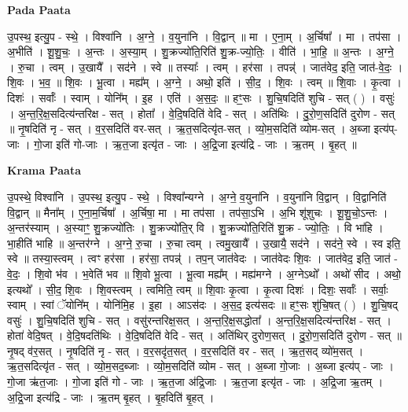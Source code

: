 \documentclass[17pt]{extarticle}
\begin{document}
\textbf{Pada Paata} \newline

उ॒पस्थ॒ इत्यु॒प - स्थे॒ । विश्वा॑नि । अ॒ग्ने॒ । व॒युना॑नि । वि॒द्वान् ॥ मा । ए॒ना॒म् । अ॒र्चिषा᳚ । मा । तप॑सा । अ॒भीति॑ । शू॒शु॒चः॒ । अ॒न्तः । अ॒स्या॒म् । शु॒क्रज्यो॑ति॒रिति॑ शु॒क्र-ज्यो॒तिः॒ । वीति॑ । भा॒हि॒ ॥ अ॒न्तः । अ॒ग्ने॒ । रु॒चा । त्वम् । उ॒खायै᳚ । सद॑ने । स्वे ॥ तस्याः᳚ । त्वम् । हर॑सा । तपन्न्॑ । जात॑वेद॒ इति॒ जात॑-वे॒दः॒ । शि॒वः । भ॒व॒ ॥ शि॒वः । भू॒त्वा । मह्य᳚म् । अ॒ग्ने॒ । अथो॒ इति॑ । सी॒द॒ । शि॒वः । त्वम् ॥ शि॒वाः । कृ॒त्वा । दिशः॑ । सर्वाः᳚ । स्वाम् । योनि᳚म् । इ॒ह । एति॑ । अ॒स॒दः॒ ॥ हꣳ॒॒सः । शु॒चि॒षदिति॑ शुचि - सत् ( ) । वसुः॑ । अ॒न्त॒रि॒क्ष॒सदित्य॑न्तरिक्ष - सत् । होता᳚ । वे॒दि॒षदिति॑ वेदि - सत् । अति॑थिः । दु॒रो॒ण॒सदिति॑ दुरोण - सत् ॥ नृ॒षदिति॑ नृ - सत् । व॒र॒सदिति॑ वर-सत् । ऋ॒त॒सदित्यृ॑त-सत् । व्यो॒म॒सदिति॑ व्योम-सत् । अ॒ब्जा इत्य॑प्-जाः । गो॒जा इति॑ गो-जाः । ऋ॒त॒जा इत्यृ॑त - जाः । अ॒द्रि॒जा इत्य॑द्रि - जाः । ऋ॒तम् । बृ॒हत् ॥  \newline


\textbf{Krama Paata} \newline

उ॒पस्थे॒ विश्वा॑नि । उ॒पस्थ॒ इत्यु॒प - स्थे॒ । विश्वा᳚न्यग्ने । अ॒ग्ने॒ व॒युना॑नि । व॒युना॑नि वि॒द्वान् । वि॒द्वानिति॑ वि॒द्वान् ॥ मैना᳚म् । ए॒ना॒म॒र्चिषा᳚ । अ॒र्चिषा॒ मा । मा तप॑सा । तप॑सा॒ऽभि । अ॒भि शू॑शुचः । शू॒शु॒चो॒ऽन्तः । अ॒न्तर॑स्याम् । अ॒स्याꣳ॒॒ शु॒क्रज्यो॑तिः । शु॒क्रज्यो॑ति॒र् वि । शु॒क्रज्यो॑ति॒रिति॑ शु॒क्र - ज्यो॒तिः॒ । वि भा॑हि । भा॒हीति॑ भाहि ॥ अ॒न्तर॑ग्ने । अ॒ग्ने॒ रु॒चा । रु॒चा त्वम् । त्वमु॒खायै᳚ । उ॒खायै॒ सद॑ने । सद॑ने॒ स्वे । स्व इति॒ स्वे ॥ तस्या॒स्त्वम् । त्वꣳ हर॑सा । हर॑सा॒ तपन्न्॑ । तप॒न् जात॑वेदः । जात॑वेदः शि॒वः । जात॑वेद॒ इति॒ जात॑ - वे॒दः॒ । शि॒वो भ॑व । भ॒वेति॑ भव ॥ शि॒वो भू॒त्वा । भू॒त्वा मह्य᳚म् । मह्य॑मग्ने । अ॒ग्नेऽथो᳚ । अथो॑ सीद । अथो॒ इत्यथो᳚ । सी॒द॒ शि॒वः । शि॒वस्त्वम् । त्वमिति॒ त्वम् ॥ शि॒वाः कृ॒त्वा । कृ॒त्वा दिशः॑ । दिशः॒ सर्वाः᳚ । सर्वाः॒ स्वाम् । स्वां ॅयोनि᳚म् । योनि॑मि॒ह । इ॒हा । आऽस॑दः । अ॒स॒द॒ इत्य॑सदः ॥ हꣳ॒॒सः शु॑चि॒षत् ( ) । शु॒चि॒षद् वसुः॑ । शु॒चि॒षदिति॑ शुचि - सत् । वसु॑रन्तरिक्ष॒सत् । अ॒न्त॒रि॒क्ष॒सद्धोता᳚ । अ॒न्त॒रि॒क्ष॒सदित्य॑न्तरिक्ष - सत् । होता॑ वेदि॒षत् । वे॒दि॒षदति॑थिः । वे॒दि॒षदिति॑ वेदि - सत् । अति॑थिर् दुरोण॒सत् । दु॒रो॒ण॒सदिति॑ दुरोण - सत् ॥ नृ॒षद् व॑र॒सत् । नृ॒षदिति॑ नृ - सत् । व॒र॒सदृ॑त॒सत् । व॒र॒सदिति॑ वर - सत् । ऋ॒त॒सद् व्यो॑म॒सत् । ऋ॒त॒सदित्यृ॑त - सत् । व्यो॒म॒सद॒ब्जाः । व्यो॒म॒सदिति॑ व्योम - सत् । अ॒ब्जा गो॒जाः । अ॒ब्जा इत्य॑प् - जाः । गो॒जा ऋ॑त॒जाः । गो॒जा इति॑ गो - जाः । ऋ॒त॒जा अ॑द्रि॒जाः । ऋ॒त॒जा इत्यृ॑त - जाः । अ॒द्रि॒जा ऋ॒तम् । अ॒द्रि॒जा इत्य॑द्रि - जाः । ऋ॒तम् बृ॒हत् । बृ॒हदिति॑ बृ॒हत् । \newline
\end{document}
